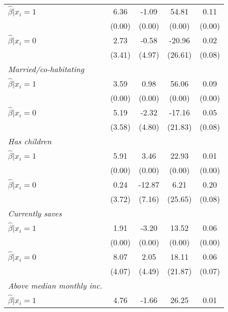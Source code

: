 \begin{table}[h]
{\begin{threeparttable}
\begin{tabular}{l*{4}{c}}
\hspace{0.5cm} \(\hat\beta|x_i=1\)&6.36\sym{*}&    -1.09&    54.81&     0.11\\
                &   (0.00)&   (0.00)&   (0.00)&   (0.00)\\
\hspace{0.5cm} \(\hat\beta|x_i=0\)&     2.73&    -0.58&   -20.96&     0.02\\
                &   (3.41)&   (4.97)&  (26.61)&   (0.08)\\
\textit{Married/co-habitating}&         &         &         &         \\
\hspace{0.5cm} \(\hat\beta|x_i=1\)&     3.59&     0.98&    56.06&     0.09\\
                &   (0.00)&   (0.00)&   (0.00)&   (0.00)\\
\hspace{0.5cm} \(\hat\beta|x_i=0\)&     5.19&    -2.32&   -17.16&     0.05\\
                &   (3.58)&   (4.80)&  (21.83)&   (0.08)\\
\textit{Has children}&         &         &         &         \\
\hspace{0.5cm} \(\hat\beta|x_i=1\)&5.91\sym{*}&     3.46&    22.93&     0.01\\
                &   (0.00)&   (0.00)&   (0.00)&   (0.00)\\
\hspace{0.5cm} \(\hat\beta|x_i=0\)&     0.24&-12.87\sym{*}&     6.21&0.20\sym{**}\\
                &   (3.72)&   (7.16)&  (25.65)&   (0.08)\\
\textit{Currently saves}&         &         &         &         \\
\hspace{0.5cm} \(\hat\beta|x_i=1\)&     1.91&    -3.20&    13.52&     0.06\\
                &   (0.00)&   (0.00)&   (0.00)&   (0.00)\\
\hspace{0.5cm} \(\hat\beta|x_i=0\)&8.07\sym{**}&     2.05&    18.11&     0.06\\
                &   (4.07)&   (4.49)&  (21.87)&   (0.07)\\
\textit{Above median monthly inc.}&         &         &         &         \\
\hspace{0.5cm} \(\hat\beta|x_i=1\)&     4.76&    -1.66&    26.25&     0.01\\

\end{tabular}
\end{threeparttable}}
\end{table}
